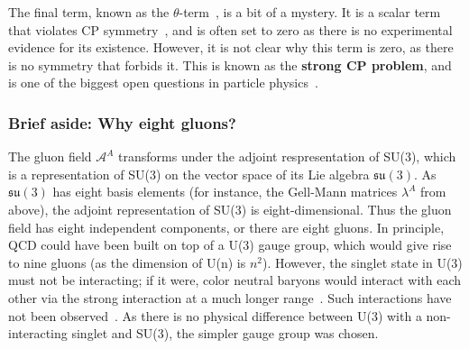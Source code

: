 The final term, known as the $\theta$-term~\cite{ThetaTerm}, is a bit of a mystery. It is a scalar term that violates CP symmetry~\cite{CPSymmetry}, and is often set to zero as there is no experimental evidence for its existence. However, it is not clear why this term is zero, as there is no symmetry that forbids it. This is known as the \textbf{strong CP problem}, and is one of the biggest open questions in particle physics~\cite{StrongCPProblem}. 


\subsubsection{Brief aside: Why eight gluons?}
\label{sec:why_eight_gluons}

The gluon field $\mathcal{A}^A$ transforms under the adjoint respresentation of SU(3), which is a representation of SU(3) on the vector space of its Lie algebra $\mathfrak{su}(3)$. As $\mathfrak{su}(3)$ has eight basis elements (for instance, the Gell-Mann matrices $\lambda^A$ from above), the adjoint representation of SU(3) is eight-dimensional. Thus the gluon field has eight independent components, or there are eight gluons. In principle, QCD could have been built on top of a U(3) gauge group, which would give rise to nine gluons (as the dimension of U(n) is $n^2$). However, the singlet state in U(3) must not be interacting; if it were, color neutral baryons would interact with each other via the strong interaction at a much longer range~\cite{SingletGluons}. Such interactions have not been observed~\cite{SingletGluons2}. As there is no physical difference between U(3) with a non-interacting singlet and SU(3), the simpler gauge group was chosen. 


